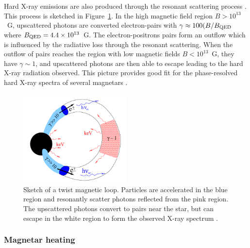 Hard X-ray emissions are also produced through the resonant scattering process \citep{2013ApJ...762...13B}.
This process is sketched in Figure~\ref{fig:magnetar-loop}.
In the high magnetic field region $B>10^{13}$~G, upscattered photons are converted electron-pairs with $\gamma\approx 100(B/B_{\rm QED}$ where $B_{\rm QED}=4.4\times 10^{13}$~G.
The electron-positrons pairs form an outflow which is influenced by the radiative loss through the resonant scattering.
When the outflow of pairs reaches the region with low magnetic fields $B<10^{13}$~G, they have $\gamma\sim 1$, and upscattered photons are then able to escape leading to the hard X-ray radiation observed.
This picture provides good fit for the phase-resolved hard X-ray spectra of several magnetars \citep{2014ApJ...786L...1H,2014ApJ...789...75V,2015ApJ...807...93A}.
%
\begin{figure}[h]
  \centering
  \includegraphics[width=0.5\textwidth]{pics/intro/magnetar-loop.png}
  \caption[Sketch of a twist magnetic loop.]{Sketch of a twist magnetic loop.
    Particles are accelerated in the blue region and resonantly scatter photons
    reflected from the pink region. The upscattered photons convert to pairs
    near the star, but can escape in the white region to form the observed X-ray
    spectrum \citep{2013ApJ...762...13B}.}
  \label{fig:magnetar-loop}
\end{figure}
%

\subsubsection{Magnetar heating}

